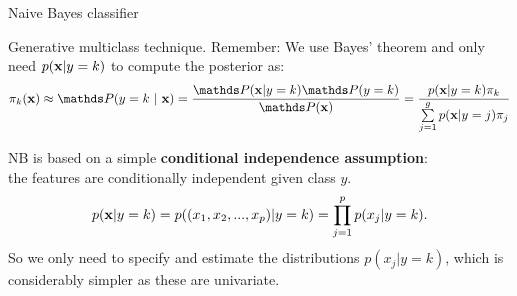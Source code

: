 \documentclass[11pt,compress,t,notes=noshow, xcolor=table]{beamer}
\begin{document}

\framebreak

\begin{vbframe}{Naive Bayes classifier}

Generative multiclass technique. Remember: We use Bayes' theorem and only need $p(\mathbf{x} | y= k)$ to compute the posterior as:
$$\pikx \approx \postk = \frac{\P(\xv | y = k) \P(y = k)}{\P(\xv)} = \frac{\pdfxyk \pik}{\sumjg \pdfxyk[j] \pi_j} $$


NB is based on a simple \textbf{conditional independence assumption}: \\
the features are conditionally independent given class $y$.
$$
p(\mathbf{x} | y= k) = p((x_1, x_2, ..., x_p)|y = k)=\prod\limits_{j=1}^p p(x_j|y = k).
$$
So we only need to specify and estimate the distributions $p(x_j|y = k)$, which is considerably simpler as these are univariate.

\end{vbframe}
\end{document}
